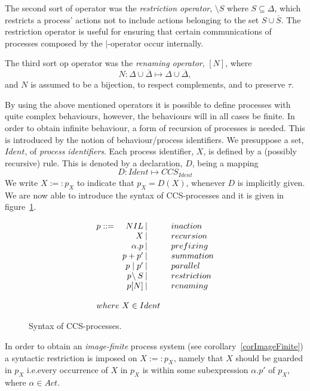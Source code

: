 The second sort of operator was the {\it restriction operator}, $\setminus S$ where $S\subseteq\Delta$, which restricts a process' actions not to include actions belonging to the set $S\cup\overline{S}$. The restriction operator is useful for ensuring that certain communications of processes composed by the $\mid$-operator occur internally.

The third sort op operator was the {\it renaming operator}, $[N]$, where
\begin{equation}
N : \Delta\cup\overline{\Delta}\mapsto\Delta\cup\overline{\Delta},
\end{equation}
and $N$ is assumed to be a bijection, to respect complements, and to preserve $\tau$.

By using the above mentioned operators it is possible to define processes with quite complex behaviours, however, the behaviours will in all cases be finite. In order to obtain infinite behaviour, a form of recursion of processes is needed. This is introduced by the notion of behaviour/process identifiers. We presuppose a set, $Ident$, of {\it process identifiers}. Each process identifier, $X$, is defined by a (possibly recursive) rule. This is denoted by a declaration, $D$, being a mapping
\[
D: Ident\mapsto CCS_{Ident}
\]
We write $X:=: p_X$ to indicate that $p_X = D(X)$, whenever $D$ is implicitly given. We are now able to introduce the syntax of CCS-processes and it is given in figure~\ref{figCCSproc}.

\begin{figure}
\[
\begin{array}{lr@{\:\mid\extracolsep{1cm}}l}
p::= & NIL          & inaction \\
     &   X          & recursion \\
     & \alpha.p     & prefixing \\
     & p + p'       & summation \\
     & p\mid p'     & parallel \\
     & p\!\setminus S & restriction \\
     & p[N]         & renaming \\
\\
\multicolumn{3}{l}{where\ X\in Ident}
\end{array}
\]
\caption{Syntax of CCS-processes.}\label{figCCSproc}
\end{figure}

In order to obtain an {\it image-finite\/} process system (see corollary~\ref{corImageFinite}) a syntactic restriction is imposed on $X :=: p_X$, namely that $X$ should be guarded in $p_X$ i.e.\@ every occurrence of $X$ in $p_X$ is within some subexpression $\alpha.p'$ of $p_X$, where $\alpha\in Act$.

